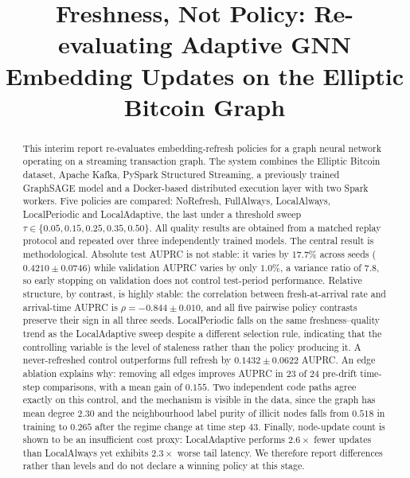 \documentclass[conference]{IEEEtran}
\begin{document}
\title{Freshness, Not Policy: Re-evaluating Adaptive GNN\\
Embedding Updates on the Elliptic Bitcoin Graph}

\author{
}

\maketitle

\begin{abstract}
This interim report re-evaluates embedding-refresh policies for a graph neural
network operating on a streaming transaction graph. The system combines the
Elliptic Bitcoin dataset, Apache Kafka, PySpark Structured Streaming, a
previously trained GraphSAGE model and a Docker-based distributed execution
layer with two Spark workers. Five policies are compared: NoRefresh,
FullAlways, LocalAlways, LocalPeriodic and LocalAdaptive, the last under a
threshold sweep $\tau \in \{0.05, 0.15, 0.25, 0.35, 0.50\}$. All quality results
are obtained from a matched replay protocol and repeated over three
independently trained models.
The central result is methodological. Absolute test AUPRC is not stable: it
varies by $17.7\%$ across seeds ($0.4210 \pm 0.0746$) while validation AUPRC
varies by only $1.0\%$, a variance ratio of $7.8$, so early stopping on
validation does not control test-period performance. Relative structure, by
contrast, is highly stable: the correlation between fresh-at-arrival rate and
arrival-time AUPRC is $\rho = -0.844 \pm 0.010$, and all five pairwise policy
contrasts preserve their sign in all three seeds. LocalPeriodic falls on the
same freshness--quality trend as the LocalAdaptive sweep despite a different
selection rule, indicating that the controlling variable is the level of
staleness rather than the policy producing it.
A never-refreshed control outperforms full refresh by $0.1432 \pm 0.0622$
AUPRC. An edge ablation explains why: removing all edges improves AUPRC in
$23$ of $24$ pre-drift time-step comparisons, with a mean gain of $0.155$. Two
independent code paths agree exactly on this control, and the mechanism is
visible in the data, since the graph has mean degree $2.30$ and the
neighbourhood label purity of illicit nodes falls from $0.518$ in training to
$0.265$ after the regime change at time step $43$. Finally, node-update count
is shown to be an insufficient cost proxy: LocalAdaptive performs $2.6\times$
fewer updates than LocalAlways yet exhibits $2.3\times$ worse tail latency.
We therefore report differences rather than levels and do not declare a
winning policy at this stage.
\end{abstract}
\end{document}
